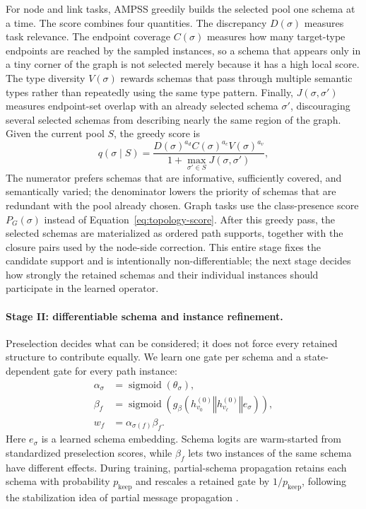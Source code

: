 \documentclass[sigconf,anonymous,review]{acmart}
\newcommand{\ampss}{\textsc{AMPSS}}
\newcommand{\concat}{\mathbin\Vert}
\begin{document}
For node and link tasks, \ampss{} greedily builds the selected pool one schema at a time.  The
score combines four quantities.  The discrepancy \(D(\sigma)\) measures task relevance.  The
endpoint coverage \(C(\sigma)\) measures how many target-type endpoints are reached by the sampled
instances, so a schema that appears only in a tiny corner of the graph is not selected merely
because it has a high local score.  The type diversity \(V(\sigma)\) rewards schemas that pass
through multiple semantic types rather than repeatedly using the same type pattern.  Finally,
\(J(\sigma,\sigma')\) measures endpoint-set overlap with an already selected schema
\(\sigma'\), discouraging several selected schemas from describing nearly the same region of the
graph.  Given the current pool \(S\), the greedy score is
\begin{equation}
  q(\sigma\mid S)=
  \frac{D(\sigma)^{a_d}C(\sigma)^{a_c}V(\sigma)^{a_v}}
       {1+\max_{\sigma'\in S}J(\sigma,\sigma')} ,
  \label{eq:topology-score}
\end{equation}
The numerator prefers schemas that are informative, sufficiently covered, and semantically varied;
the denominator lowers the priority of schemas that are redundant with the pool already chosen.
Graph tasks use the class-presence score \(P_G(\sigma)\) instead of Equation~\ref{eq:topology-score}.
After this greedy pass, the selected schemas are materialized as ordered path supports, together
with the closure pairs used by the node-side correction.  This entire stage fixes the candidate
support and is intentionally non-differentiable; the next stage decides how strongly the retained
schemas and their individual instances should participate in the learned operator.

\paragraph{Stage II: differentiable schema and instance refinement.}
Preselection decides what can be considered; it does not force every retained structure to
contribute equally.  We learn one gate per schema and a state-dependent gate for every path
instance:
\begin{equation}
  \begin{aligned}
  \alpha_\sigma&=\operatorname{sigmoid}(\theta_\sigma),\\
  \beta_f&=\operatorname{sigmoid}\!\left(
    g_\beta(h_{v_0}^{(0)}\concat h_{v_\ell}^{(0)}\concat e_\sigma)
  \right),\\
  w_f&=\alpha_{\sigma(f)}\beta_f .
  \end{aligned}
  \label{eq:gates}
\end{equation}
Here \(e_\sigma\) is a learned schema embedding.  Schema logits are warm-started from standardized
preselection scores, while \(\beta_f\) lets two instances of the same schema have different
effects.  During training, partial-schema propagation retains each schema with probability
\(p_{\mathrm{keep}}\) and rescales a retained gate by \(1/p_{\mathrm{keep}}\), following the
stabilization idea of partial message propagation \cite{li2023pmmm}.
\end{document}

